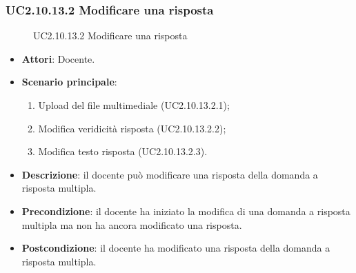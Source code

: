 \subsubsection{UC2.10.13.2 Modificare una risposta}
\begin{figure}[H]
\centering
\noindent{}
\caption{UC2.10.13.2 Modificare una risposta}
\end{figure}
\begin{itemize}
\item \textbf{Attori}: Docente.
\item \textbf{Scenario principale}:
\begin{enumerate}
\item Upload del file multimediale (UC2.10.13.2.1);
\item Modifica veridicità risposta (UC2.10.13.2.2);
\item Modifica testo risposta (UC2.10.13.2.3).
\end{enumerate}
\item \textbf{Descrizione}: il docente può modificare una risposta della domanda a risposta multipla.
\item \textbf{Precondizione}: il docente ha iniziato la modifica di una domanda a risposta multipla ma non ha ancora modificato una risposta.
\item \textbf{Postcondizione}: il docente ha modificato una risposta della domanda a risposta multipla.
\end{itemize}
